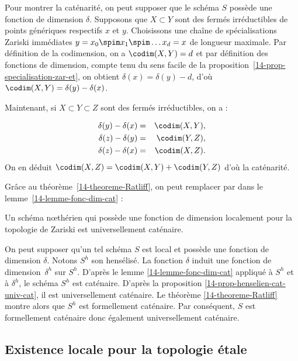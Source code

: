 \documentclass[10pt]{../fichiers-configuration-latex/smfart}
\begin{document}
\begin{démo} Pour montrer la caténarité, on peut supposer que le schéma $S$ possède une fonction de
dimension $\delta$. Supposons que $X\subset Y$ sont des fermés irréductibles de points génériques
respectifs $x$ et $y$. Choisissons une chaîne de spécialisations Zariski immédiates $y=x_0\spim
x_1\spim \dots x_d=x$ de longueur maximale. Par définition de la codimension, on a $\codim(X,Y)=d$
et par définition des fonctions de dimension, compte tenu du sens facile de la
proposition~\ref{14-prop-specialisation-zar-et}, on obtient $\delta(x)=\delta(y)-d$, d'où
$\codim(X,Y)=\delta(y)-\delta(x)$.

Maintenant, si $X\subset Y\subset Z$ sont des fermés irréductibles, on a :

\begin{eqnarray*} \delta(y)-\delta(x) &=& \codim(X,Y) , \\ \delta(z)-\delta(y) &=& \codim(Y,Z) , \\
\delta(z)-\delta(x) &=& \codim(X,Z) .  \end{eqnarray*}On en déduit
$\codim(X,Z)=\codim(X,Y)+\codim(Y,Z)$ d'où la caténarité.  \end{démo}

\medskip

Grâce au théorème~\ref{14-theoreme-Ratliff}, on peut remplacer  par
 dans  le lemme~\ref{14-lemme-fonc-dim-cat} :

\begin{proposition2} \label{14-proposition-fonc-dim-univ-cat} Un schéma nœthérien qui possède une
fonction de dimension localement pour la topologie de Zariski est universellement caténaire.
\end{proposition2}

\begin{démo} On peut supposer qu'un tel schéma $S$ est local et possède une fonction de dimension
$\delta$. Notons $S^h$ son hensélisé. La fonction $\delta$ induit une fonction de
dimension~$\delta^h$ sur $S^h$. D'après le lemme \ref{14-lemme-fonc-dim-cat} appliqué à $S^h$ et à
$\delta^h$, le schéma $S^h$ est caténaire. D'après la proposition
\ref{14-prop-henselien-cat-univ-cat}, il est universellement caténaire. Le théorème
\ref{14-theoreme-Ratliff} montre alors que $S^h$ est formellement caténaire. Par conséquent, $S$ est
formellement caténaire donc également universellement caténaire.  \end{démo}

\subsection{Existence locale pour la topologie étale}
\end{document}
